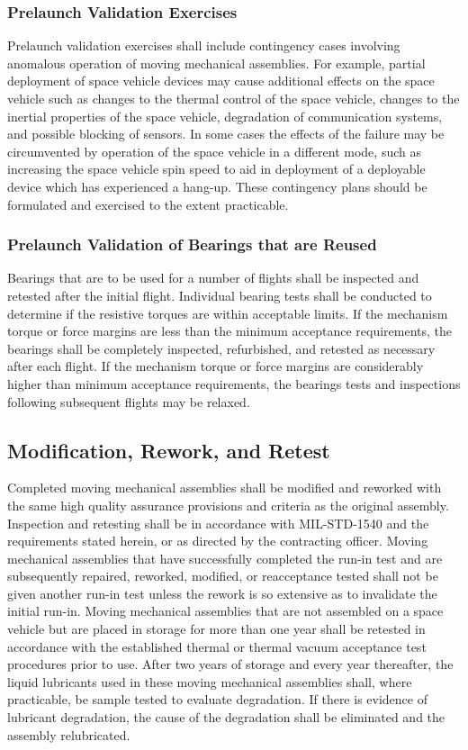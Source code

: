 \documentclass[12pt]{article}
\begin{document}
\subsubsection{Prelaunch Validation Exercises} %
Prelaunch validation exercises shall include contingency cases involving anomalous operation of moving mechanical assemblies. 
For example, partial deployment of space vehicle devices may cause additional effects on the space vehicle such as changes to the thermal control of the space vehicle, changes to the inertial properties of the space vehicle, degradation of communication systems, and possible blocking of sensors. 
In some cases the effects of the failure may be circumvented by operation of the space vehicle in a different mode, such as increasing the space vehicle spin speed to aid in deployment of a deployable device which has experienced a hang-up. 
These contingency plans should be formulated and exercised to the extent practicable.

\subsubsection{Prelaunch Validation of Bearings that are Reused} %
Bearings that are to be used for a number of flights shall be inspected and retested after the initial flight. 
Individual bearing tests shall be conducted to determine if the resistive torques are within acceptable limits. 
If the mechanism torque or force margins are less than the minimum acceptance requirements, the bearings shall be completely inspected, refurbished, and retested as necessary after each flight. 
If the mechanism torque or force margins are considerably higher than minimum acceptance requirements, the bearings tests and inspections following subsequent flights may be relaxed.

\subsection{Modification, Rework, and Retest} %
Completed moving mechanical assemblies shall be modified and reworked with the same high quality assurance provisions and criteria as the original assembly. 
Inspection and retesting shall be in accordance with MIL-STD-1540 and the requirements stated herein, or as directed by the contracting officer. 
Moving mechanical assemblies that have successfully completed the run-in test and are subsequently repaired, reworked, modified, or reacceptance tested shall not be given another run-in test unless the rework is so extensive as to invalidate the initial run-in. 
Moving mechanical assemblies that are not assembled on a space vehicle but are placed in storage for more than one year shall be retested in accordance with the established thermal or thermal vacuum acceptance test procedures prior to use. 
After two years of storage and every year thereafter, the liquid lubricants used in these moving mechanical assemblies shall, where practicable, be sample tested to evaluate degradation. 
If there is evidence of lubricant degradation, the cause of the degradation shall be eliminated and the assembly relubricated.
\end{document}
